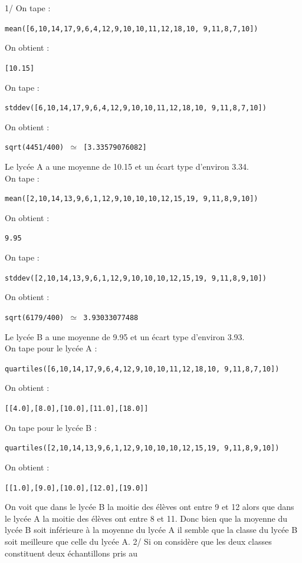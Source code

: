 \documentclass[a4paper,11pt]{book}
\begin{document}
\begin{itemize}
1/ On tape :
\begin{center}{\tt mean([6,10,14,17,9,6,4,12,9,10,10,11,12,18,10, 9,11,8,7,10])}\end{center}
On obtient :
\begin{center}{\tt [10.15]}\end{center}
On tape :
\begin{center}{\tt stddev([6,10,14,17,9,6,4,12,9,10,10,11,12,18,10, 9,11,8,7,10])}\end{center}
On obtient :
\begin{center}{\tt sqrt(4451/400) $\simeq$ [3.33579076082]}\end{center}
Le lyc\'ee A a une moyenne de 10.15 et un \'ecart type d'environ 3.34.\\
On tape :
\begin{center}{\tt mean([2,10,14,13,9,6,1,12,9,10,10,10,12,15,19, 9,11,8,9,10])}\end{center}
On obtient :
\begin{center}{\tt 9.95}\end{center}
On tape :
\begin{center}{\tt stddev([2,10,14,13,9,6,1,12,9,10,10,10,12,15,19, 9,11,8,9,10])}\end{center}
On obtient :
\begin{center}{\tt sqrt(6179/400) $\simeq$ 3.93033077488}\end{center}
Le lyc\'ee B a une moyenne de 9.95 et un \'ecart type d'environ 3.93.\\
On tape pour le lyc\'ee A :
\begin{center}{\tt quartiles([6,10,14,17,9,6,4,12,9,10,10,11,12,18,10, 9,11,8,7,10])}\end{center}
On obtient :
\begin{center}{\tt [[4.0],[8.0],[10.0],[11.0],[18.0]]}\end{center}
On tape pour le lyc\'ee B :
\begin{center}{\tt quartiles([2,10,14,13,9,6,1,12,9,10,10,10,12,15,19, 9,11,8,9,10])}\end{center}
On obtient :
\begin{center}{\tt [[1.0],[9.0],[10.0],[12.0],[19.0]]}\end{center}
On voit que dans le lyc\'ee B la moitie des \'el\`eves ont entre 9 et 12 
alors que dans le lyc\'ee A la moitie des \'el\`eves ont  entre 8 et 11. Donc
 bien que la moyenne du lyc\'ee B soit inf\'erieure \`a la moyenne du lyc\'ee A
il semble que la classe du lyc\'ee B soit meilleure que celle du lyc\'ee A.
2/ 
Si on consid\`ere que les deux classes constituent deux \'echantillons pris au 

\end{itemize}
\end{document}
